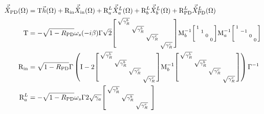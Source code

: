\begingroup
\allowdisplaybreaks
\begin{align}
\vec{\hat X}_\mathrm{PD}(\Omega)&=\text{T}\vec h(\Omega)+\text{R}_\text{in}\vec{\hat X}_\mathrm{in}(\Omega)+\text{R}^L_a\vec{\hat X}^L_a(\Omega)+\text{R}^L_b\vec{\hat X}^L_b(\Omega)+\text{R}^L_\text{PD}\vec{\hat X}^L_\text{PD}(\Omega)\\
\text{T}&=-\sqrt{1-R_\text{PD}}\omega_s(-i\beta)\Gamma \sqrt{2}\begin{bsmallmatrix}
\sqrt{\gamma^b_R} &  &  &  \\
 & \sqrt{\gamma^b_R} &  &  \\
 &  & \sqrt{\gamma^c_R} &  \\
 &  &  & \sqrt{\gamma^c_R}
\end{bsmallmatrix}\text{M}_b^{-1}\begin{bsmallmatrix}
1 &  &  &  \\
 & 1 &  &  \\
 &  & 0 &  \\
 &  &  & 0
\end{bsmallmatrix}\text{M}_a^{-1}\begin{bsmallmatrix}
1 &  &  &  \\
 & -1 &  &  \\
 &  & 0 &  \\
 &  &  & 0
\end{bsmallmatrix}\\
\text{R}_\text{in}&=\sqrt{1-R_\text{PD}}\Gamma\left(\text{I}-2\begin{bsmallmatrix}
\sqrt{\gamma^b_R} &  &  &  \\
 & \sqrt{\gamma^b_R} &  &  \\
 &  & \sqrt{\gamma^c_R} &  \\
 &  &  & \sqrt{\gamma^c_R}
\end{bsmallmatrix}\text{M}_b^{-1}\begin{bsmallmatrix}
\sqrt{\gamma^b_R} &  &  &  \\
 & \sqrt{\gamma^b_R} &  &  \\
 &  & \sqrt{\gamma^c_R} &  \\
 &  &  & \sqrt{\gamma^c_R}
\end{bsmallmatrix}\right)\Gamma^{-1}\\
\text{R}^L_a&=-\sqrt{1-R_\text{PD}}\omega_s\Gamma 2\sqrt{\gamma_a}\begin{bsmallmatrix}
\sqrt{\gamma^b_R} &  &  &  \\
 & \sqrt{\gamma^b_R} &  &  \\
 &  & \sqrt{\gamma^c_R} &  \\

\end{bsmallmatrix}
\end{align}
